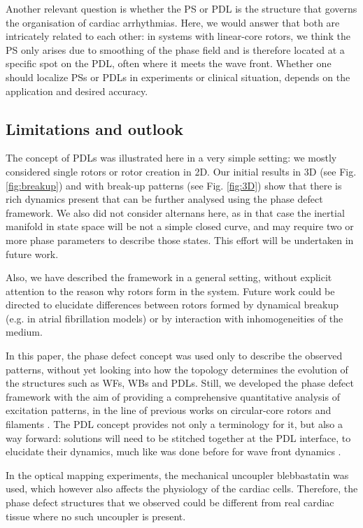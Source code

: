 \documentclass{article}
\begin{document}
Another relevant question is whether the PS or PDL is the structure that governs the organisation of cardiac arrhythmias. Here, we would answer that both are intricately related to each other: in systems with linear-core rotors, we think the PS only arises due to smoothing of the phase field and is therefore located at a specific spot on the PDL, often where it meets the wave front. Whether one should localize PSs or PDLs in experiments or clinical situation, depends on the application and desired accuracy.

\subsection{Limitations and outlook}

The concept of PDLs was illustrated here in a very simple setting: we mostly considered single rotors or rotor creation in 2D. Our initial results in 3D (see Fig. \ref{fig:breakup}) and with break-up patterns (see Fig. \ref{fig:3D}) show that there is rich dynamics present that can be further analysed using the phase defect framework. We also did not consider alternans here, as in that case the inertial manifold in state space will be not a simple closed curve, and may require two or more phase parameters to describe those states. This effort will be undertaken in future work. 

Also, we have described the framework in a general setting, without explicit attention to the reason why rotors form in the system. Future work could be directed to elucidate differences between rotors formed by dynamical breakup (e.g. in atrial fibrillation models) or by interaction with inhomogeneities of the medium. 

In this paper, the phase defect concept was used only to describe the observed patterns, without yet looking into how the topology determines the evolution of the structures such as WFs, WBs and PDLs. Still, we developed the phase defect framework with the aim of providing a comprehensive quantitative analysis of excitation patterns, in the line of previous works on circular-core rotors and filaments \citep{Keener:1988,Wellner:2002,Verschelde:2007,Dierckx:2012}. The PDL concept provides not only a terminology for it, but also a way forward: solutions will need to be stitched together at the PDL interface, to elucidate their dynamics, much like was done before for wave front dynamics \citep{Keener:1986}. 

In the optical mapping experiments, the mechanical uncoupler blebbastatin was used, which however also affects the physiology of the cardiac cells. Therefore, the phase defect structures that we observed could be different from real cardiac tissue where no such uncoupler is present. 
\end{document}
